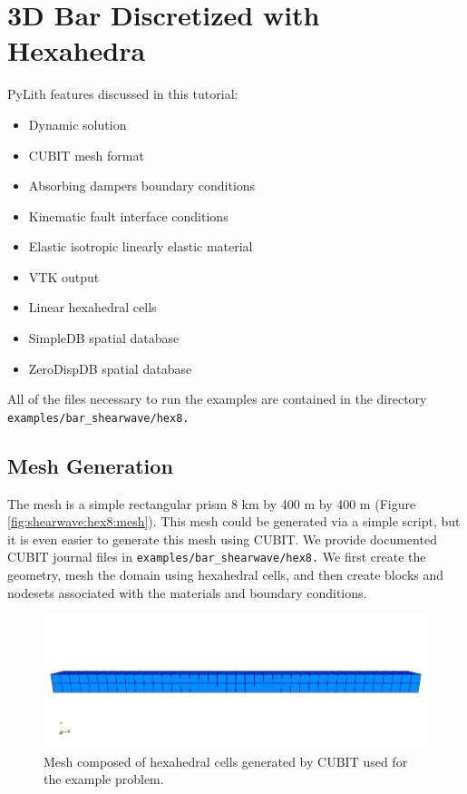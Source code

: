 
\section{\label{sec:tutorial:shearwave:hex8}3D Bar Discretized with Hexahedra}

PyLith features discussed in this tutorial:
\begin{itemize}
\item Dynamic solution
\item CUBIT mesh format
\item Absorbing dampers boundary conditions
\item Kinematic fault interface conditions
\item Elastic isotropic linearly elastic material
\item VTK output
\item Linear hexahedral cells
\item SimpleDB spatial database
\item ZeroDispDB spatial database
\end{itemize}
All of the files necessary to run the examples are contained in the
directory \texttt{examples/bar\_shearwave/hex8.}


\subsection{Mesh Generation}

The mesh is a simple rectangular prism 8 km by 400 m by 400 m (Figure
\vref{fig:shearwave:hex8:mesh}). This mesh could be generated via
a simple script, but it is even easier to generate this mesh using
CUBIT. We provide documented CUBIT journal files in \texttt{examples/bar\_shearwave/hex8.}
We first create the geometry, mesh the domain using hexahedral cells,
and then create blocks and nodesets associated with the materials
and boundary conditions.

\noindent \begin{center}
\begin{figure}
\begin{centering}
\includegraphics[scale=0.5]{tutorials/shearwave/figs/hex8mesh}
\par\end{centering}

\caption{Mesh composed of hexahedral cells generated by CUBIT used for the
example problem.\label{fig:shearwave:hex8:mesh}}
\end{figure}

\par\end{center}


